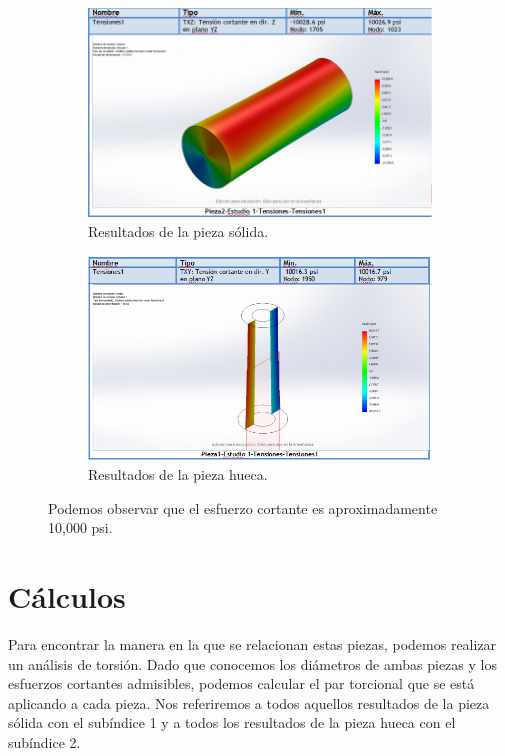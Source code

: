 \documentclass[12pt, letterpaper]{article}
\begin{document}
\begin{figure}[H]
	\centering
	\begin{subfigure}[b]{0.49\linewidth}
		\includegraphics[width=\linewidth]{r1.png}
		\caption{Resultados de la pieza sólida.}
	\end{subfigure}
	\begin{subfigure}[b]{0.49\linewidth}
		\includegraphics[width=\linewidth]{r2.png}
		\caption{Resultados de la pieza hueca.}
	\end{subfigure}
	\caption{Podemos observar que el esfuerzo cortante es aproximadamente 10,000 psi.}
\end{figure}

\section*{Cálculos}

Para encontrar la manera en la que se relacionan estas piezas, podemos realizar un análisis de torsión. Dado que conocemos los diámetros de ambas piezas y los esfuerzos cortantes admisibles, podemos calcular el par torcional que se está aplicando a cada pieza. Nos referiremos a todos aquellos resultados de la pieza sólida con el subíndice 1 y a todos los resultados de la pieza hueca con el subíndice 2.
\end{document}
